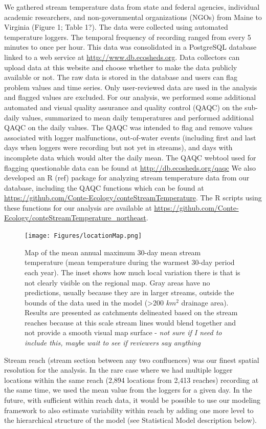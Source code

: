 We gathered stream temperature data from state and federal agencies,
individual academic researchers, and non-governmental organizations
(NGOs) from Maine to Virginia (Figure 1; Table 1?). The data were
collected using automated temperature loggers. The temporal frequency of
recording ranged from every 5 minutes to once per hour. This data was
consolidated in a PostgreSQL database linked to a web service at
\url{http://www.db.ecosheds.org}. Data collectors can upload data at
this website and choose whether to make the data publicly available or
not. The raw data is stored in the database and users can flag problem
values and time series. Only user-reviewed data are used in the analysis
and flagged values are excluded. For our analysis, we performed some
additional automated and visual quality assurance and quality control
(QAQC) on the sub-daily values, summarized to mean daily temperatures
and performed additional QAQC on the daily values. The QAQC was intended
to flag and remove values associated with logger malfunctions,
out-of-water events (including first and last days when loggers were
recording but not yet in streams), and days with incomplete data which
would alter the daily mean. The QAQC webtool used for flagging
questionable data can be found at \url{http://db.ecosheds.org/qaqc} We
also developed an R (ref) package for analyzing stream temperature data
from our database, including the QAQC functions which can be found at
\url{https://github.com/Conte-Ecology/conteStreamTemperature}. The R
scripts using these functions for our analysis are available at
\url{https://github.com/Conte-Ecology/conteStreamTemperature_northeast}.

\begin{figure}[htbp]
\centering
\texttt{[image: Figures/locationMap.png]}
\caption{Map of the mean annual maximum 30-day mean stream temperature
(mean temperature during the warmest 30-day period each year). The inset
shows how much local variation there is that is not clearly visible on
the regional map. Gray areas have no predictions, usually because they
are in larger streams, outside the bounds of the data used in the model
(\textgreater{}200 \(km^2\) drainage area). Results are presented as
catchments delineated based on the stream reaches because at this scale
stream lines would blend together and not provide a smooth visual map
surface - \emph{not sure if I need to include this, maybe wait to see if
reviewers say anything}}
\end{figure}

Stream reach (stream section between any two confluences) was our finest
spatial resolution for the analysis. In the rare case where we had
multiple logger locations within the same reach (2,894 locations from
2,413 reaches) recording at the same time, we used the mean value from
the loggers for a given day. In the future, with sufficient within reach
data, it would be possible to use our modeling framework to also
estimate variability within reach by adding one more level to the
hierarchical structure of the model (see Statistical Model description
below).


